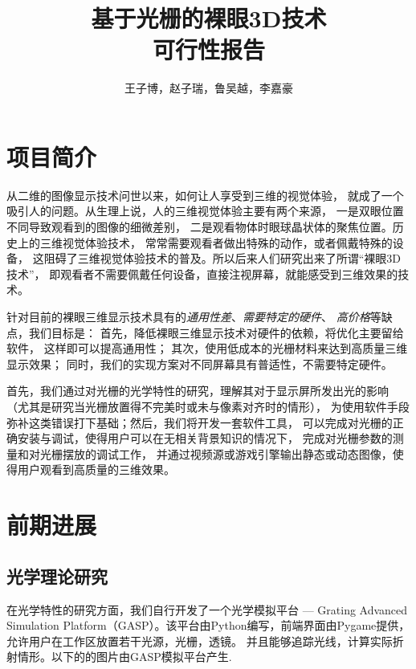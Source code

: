 \documentclass[12pt,a4paper]{article}
\begin{document}
\setcounter{topnumber}{10}
\setcounter{totalnumber}{10}

\title{基于光栅的裸眼3D技术\\可行性报告}
\author{王子博，赵子瑞，鲁吴越，李嘉豪}
\maketitle
\tableofcontents
\newpage

\section{项目简介}

从二维的图像显示技术问世以来，如何让人享受到三维的视觉体验，
就成了一个吸引人的问题。从生理上说，人的三维视觉体验主要有两个来源，
一是双眼位置不同导致观看到的图像的细微差别，
二是观看物体时眼球晶状体的聚焦位置。历史上的三维视觉体验技术，
常常需要观看者做出特殊的动作，或者佩戴特殊的设备，
这阻碍了三维视觉体验技术的普及。所以后来人们研究出来了所谓“裸眼3D技术”，
即观看者不需要佩戴任何设备，直接注视屏幕，就能感受到三维效果的技术。

针对目前的裸眼三维显示技术具有的\emph{通用性差}、\emph{需要特定的硬件}、
\emph{高价格}等缺点，我们目标是：
首先，降低裸眼三维显示技术对硬件的依赖，将优化主要留给软件，
这样即可以提高通用性；
其次，使用低成本的光栅材料来达到高质量三维显示效果；
同时，我们的实现方案对不同屏幕具有普适性，不需要特定硬件。

首先，我们通过对光栅的光学特性的研究，理解其对于显示屏所发出光的影响
（尤其是研究当光栅放置得不完美时或未与像素对齐时的情形），
为使用软件手段弥补这类错误打下基础；然后，我们将开发一套软件工具，
可以完成对光栅的正确安装与调试，使得用户可以在无相关背景知识的情况下，
完成对光栅参数的测量和对光栅摆放的调试工作，
并通过视频源或游戏引擎输出静态或动态图像，使得用户观看到高质量的三维效果。

\section{前期进展}

\subsection{光学理论研究}
在光学特性的研究方面，我们自行开发了一个光学模拟平台 --- Grating Advanced Simulation Platform（GASP）。该平台由Python编写，前端界面由Pygame提供，允许用户在工作区放置若干光源，光栅，透镜。 并且能够追踪光线，计算实际折射情形。以下的的图片由GASP模拟平台产生.
\end{document}
